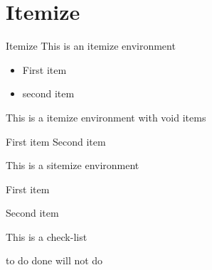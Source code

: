 %
%
\section{Itemize}\label{sec:itemize}
\begin{frame}{Itemize}
  This is an itemize environment\\
  \begin{itemize}
    \item First item
    \item second item
  \end{itemize}

  This is a itemize environment with void items\\
  \begin{itemize}
  \voiditem First item
  \voiditem Second item
  \end{itemize}

  This is a sitemize environment\\
  \begin{sitemize}[margin=30pt,sitemsep=0.4cm]
    \item First item
    \item Second item
  \end{sitemize}

  This is a check-list\\
  \begin{sitemize}
    \todoitem to do
    \doneitem done
    \notdoitem will not do
  \end{sitemize}
\end{frame}
